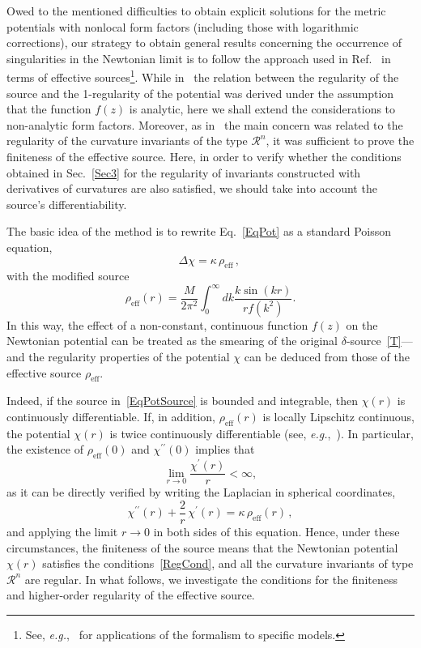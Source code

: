 \documentclass[aps,prd,a4paper,twocolumn,showpacs,showkeys,preprintnumbers,amsmath,amssymb,nofootinbib]{revtex4-2}
\numberwithin{equation}{section}
\def\de{\delta}
\def\ka{\kappa}
\def\lap{\Delta}
\begin{document}
Owed to the mentioned difficulties to obtain explicit solutions for the metric potentials with 
nonlocal form factors (including those with
logarithmic corrections), our strategy to obtain general results concerning the occurrence of singularities in the Newtonian limit is to follow the approach used in Ref.~\cite{BreTib2} in terms of effective sources\footnote{See, \textit{e.g.},~\cite{Tseytlin:1995uq,Nicolini:2005vd,Nicolini:2008aj,Modesto:2010uh,Modesto12,Zhang14,Modesto-LWBH,JBoos,Buoninfante:2018rlq} for applications of the formalism to specific models.}. 
While in~\cite{BreTib2} the relation between the regularity of the source and the 1-regularity of the potential was derived under the assumption that the function $f(z)$ is analytic, here we shall extend the considerations to non-analytic form factors. Moreover, as in~\cite{BreTib2} the main concern was related to the regularity of the curvature invariants of the type $\mathcal{R}^n$, it was sufficient to prove the finiteness of the effective source. Here, in order to verify whether the conditions obtained in Sec.~\ref{Sec3} for the regularity of invariants constructed with derivatives of curvatures are also satisfied, we should take into account the source's differentiability.

The basic idea of the method is to rewrite Eq.~\eqref{EqPot} as a standard Poisson equation,
\begin{equation}
\label{EqPotSource}
\lap \chi  =   \ka \, \rho_\text{eff} \, ,
\, 
\end{equation}
with the modified source
\begin{equation}
\label{rho_def}
\rho_\text{eff}(r) = \frac{M}{2 \pi^2} \int_{0}^{\infty} dk  \frac{k \sin(kr)}{r f(k^2)} .
\end{equation}
In this way, the effect of a non-constant, continuous function $f(z)$ on the Newtonian potential can be treated as the smearing of the original $\de$-source~\eqref{T}---and the regularity properties of the potential $\chi$ can be deduced from those of the effective source $\rho_\text{eff}$. 

Indeed, if the source in~\eqref{EqPotSource} is bounded and integrable, then $\chi(r)$ is continuously differentiable. If, in addition, $\rho_\text{eff}(r)$ is locally Lipschitz continuous, the potential $\chi(r)$ is twice continuously differentiable (see, \textit{e.g.},~\cite{Book-PDE}). In particular, the existence of $\rho_\text{eff}(0)$ and $\chi^{\prime\prime}(0)$ implies that
$$
\lim_{r \rightarrow 0} \frac{\chi^\prime(r)}{r} < \infty,
$$
as it can be directly verified by writing the Laplacian in spherical coordinates,
\begin{equation} \label{Lapla}
\chi^{\prime\prime}(r) + \frac{2}{r} \, \chi^\prime(r)  =  \ka \, \rho_\text{eff}(r) \, ,
\end{equation}
and applying the limit $r\to 0$ in both sides of this equation. Hence, under these circumstances, the finiteness of the source means that the Newtonian potential $\chi(r)$ satisfies the conditions~\eqref{RegCond}, and all the curvature invariants of type $\mathcal{R}^n$  are regular. In what follows, we investigate the conditions for the finiteness and higher-order regularity of the effective source.
\end{document}
